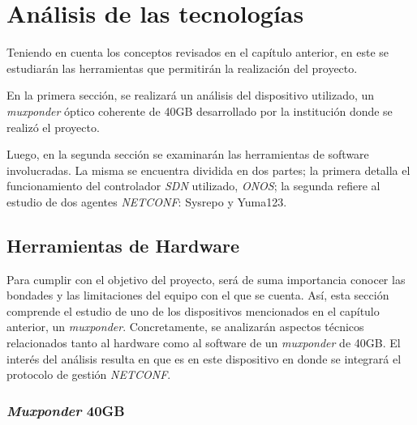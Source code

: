  
\chapter{Análisis de las tecnologías} %

\label{Chapter3} %

Teniendo en cuenta los conceptos revisados en el capítulo anterior, en este se estudiarán las herramientas que permitirán la realización del proyecto. 

En la primera sección, se realizará un análisis del dispositivo utilizado, un \textit{muxponder} óptico coherente de 40GB desarrollado por la institución donde se realizó el proyecto.

Luego, en la segunda sección se examinarán las herramientas de software involucradas. La misma se encuentra dividida en dos partes; la primera detalla el funcionamiento del controlador \textit{SDN} utilizado, \textit{ONOS}; la segunda refiere al estudio de dos agentes \textit{NETCONF}: Sysrepo y Yuma123.



\section{Herramientas de Hardware}

Para cumplir con el objetivo del proyecto, será de suma importancia conocer las bondades y las limitaciones del equipo con el que se cuenta. Así, esta sección comprende el estudio de uno de los dispositivos mencionados en el capítulo anterior, un \textit{muxponder}. Concretamente, se analizarán aspectos técnicos relacionados tanto al hardware como al software de un \textit{muxponder} de 40GB. El interés del análisis resulta en que es en este dispositivo en donde se integrará el protocolo de gestión \textit{NETCONF}.

\subsection{\textit{Muxponder} 40GB}

